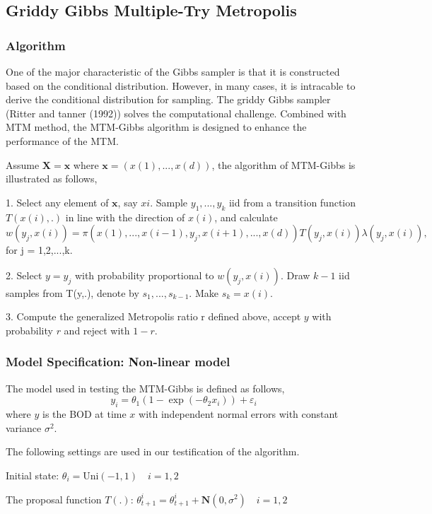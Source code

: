 \documentclass{article} %
\begin{document}
\subsection{Griddy Gibbs Multiple-Try Metropolis}
\subsubsection{Algorithm}
One of the major characteristic of the Gibbs sampler is that it is constructed based on the conditional distribution. However, in many cases, it is intracable to derive the conditional distribution for sampling. The griddy Gibbs sampler (Ritter and tanner (1992)) solves the computational challenge. Combined with MTM method, the MTM-Gibbs algorithm is designed to enhance the performance of the MTM.

Assume $\mathbf{X} = \mathbf{x}$ where $\mathbf{x}=(x(1),...,x(d))$, the algorithm of MTM-Gibbs is illustrated as follows,

1. Select any element of $\mathbf{x}$, say $x{i}$. Sample $y_1,..., y_k$ iid from a transition function $T(x(i),.)$ in line with the direction of $x(i)$, and calculate 
\begin{equation*}
w(y_j,x(i)) = \pi(x(1),...,x(i-1),y_j,x(i+1),...,x(d)) T(y_j,x(i)) \lambda(y_j,x(i)),
\end{equation*}
for j = 1,2,...,k.

2. Select $y=y_j$ with probability proportional to $w(y_j,x(i))$. Draw $k-1$ iid samples from T(y,.), denote by $s_1,...,s_{k-1}$. Make $s_k=x(i)$.

3. Compute the generalized Metropolis ratio r defined above, accept $y$ with probability $r$ and reject with $1-r$.

\subsubsection{Model Specification: Non-linear model}
The model used in testing the MTM-Gibbs is defined as follows,
$$y_i=\theta_1(1-\exp(-\theta_2x_i))+\varepsilon_i$$
where $y$ is the BOD at time $x$ with independent normal errors with constant variance $\sigma^2$.

The following settings are used in our testification of the algorithm.

Initial state: $\theta_i = \text{Uni}(-1,1) \quad i = 1,2$

The proposal function $T(.)$:
$\theta_{t+1}^{i} = \theta_{t+1}^{i} + \mathbf{N}(0,\sigma^2)\quad i = 1,2$
\end{document}
